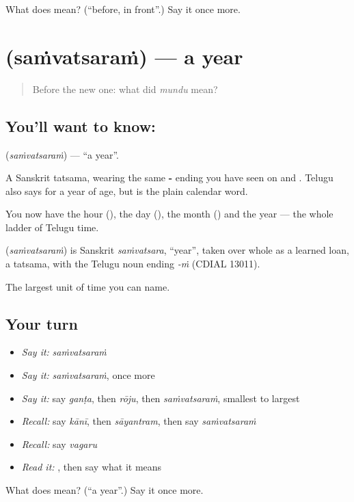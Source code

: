 \begin{tcolorbox}[breakable,colback=teal!4,colframe=teal!35!black,title={Before you move on}]
What does  mean? (\textquotedblleft{}before, in front\textquotedblright{}.) Say it once more.
\end{tcolorbox}
\section[\texorpdfstring{\te{సంవత్సరం} (saṁvatsaraṁ)}{సంవత్సరం (saṁvatsaraṁ)}]{ (saṁvatsaraṁ) — a year}

\label{lesson:TE-C75-year}



\begin{quote}
Before the new one: what did \emph{mundu} mean?
\end{quote}

\subsection*{You'll want to know: }
\textbf{} (\emph{saṁvatsaraṁ}) — \textquotedblleft{}a year\textquotedblright{}.

A Sanskrit tatsama, wearing the same \textbf{-} ending you have seen on  and . Telugu also says \textbf{} for a year of age, but  is the plain calendar word.

You now have the hour (), the day (), the month () and the year — the whole ladder of Telugu time.

\begin{cousinweb}
\textbf{} (\emph{saṁvatsaraṁ}) is Sanskrit \emph{saṁvatsara}, \textquotedblleft{}year\textquotedblright{}, taken over whole as a learned loan, a tatsama, with the Telugu noun ending \emph{-ṁ} (CDIAL 13011).
\end{cousinweb}

\begin{grammarlens}[title={What you've built}]
The largest unit of time you can name.
\end{grammarlens}

\subsection*{Your turn}
\begin{itemize}
\raggedright
  \item \emph{Say it:} \emph{saṁvatsaraṁ}
  \item \emph{Say it:} \emph{saṁvatsaraṁ}, once more
  \item \emph{Say it:} say \emph{ganṭa}, then \emph{rōju}, then \emph{saṁvatsaraṁ}, smallest to largest
  \item \emph{Recall:} say \emph{kānī}, then \emph{sāyantram}, then say \emph{saṁvatsaraṁ}
  \item \emph{Recall:} say \emph{vagaru}
  \item \emph{Read it:} \textbf{}, then say what it means
\end{itemize}

\begin{tcolorbox}[breakable,colback=teal!4,colframe=teal!35!black,title={Before you move on}]
What does  mean? (\textquotedblleft{}a year\textquotedblright{}.) Say it once more.
\end{tcolorbox}
